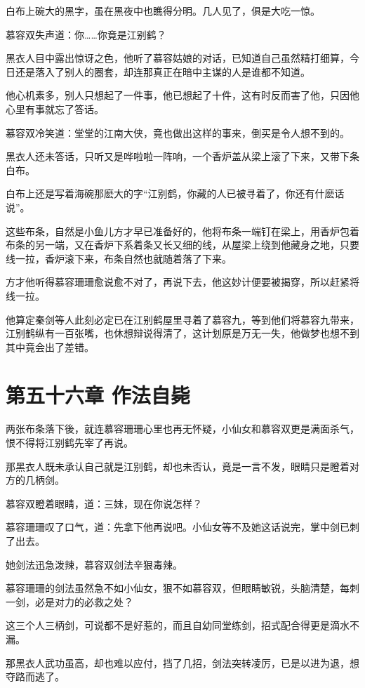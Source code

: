 \documentclass[12pt,oneside]{book}
\begin{document}
白布上碗大的黑字，虽在黑夜中也瞧得分明。几人见了，俱是大吃一惊。

慕容双失声道：你\ldots\ldots 你竟是江别鹤？

黑衣人目中露出惊讶之色，他听了慕容姑娘的对话，已知道自己虽然精打细算，今日还是落入了别人的圈套，却连那真正在暗中主谋的人是谁都不知道。

他心机素多，别人只想起了一件事，他已想起了十件，这有时反而害了他，只因他心里有事就忘了答话。

慕容双冷笑道：堂堂的江南大侠，竟也做出这样的事来，倒买是令人想不到的。

黑衣人还未答话，只听又是哗啦啦一阵响，一个香炉盖从梁上滚了下来，又带下条白布。

白布上还是写着海碗那麽大的字``江别鹤，你藏的人已被寻着了，你还有什麽话说''。

这些布条，自然是小鱼儿方才早已准备好的，他将布条一端钉在梁上，用香炉包着布条的另一端，又在香炉下系着条又长又细的线，从屋梁上绕到他藏身之地，只要线一拉，香炉滚下来，布条自然也就随着落了下来。

方才他听得慕容珊珊愈说愈不对了，再说下去，他这妙计便要被揭穿，所以赶紧将线一拉。

他算定秦剑等人此刻必定已在江别鹤屋里寻着了慕容九，等到他们将慕容九带来，江别鹤纵有一百张嘴，也休想辩说得清了，这计划原是万无一失，他做梦也想不到其中竟会出了差错。

\hypertarget{ux7b2cux4e94ux5341ux516dux7ae0-ux4f5cux6cd5ux81eaux6bd9}{%
\chapter{第五十六章
作法自毙}\label{ux7b2cux4e94ux5341ux516dux7ae0-ux4f5cux6cd5ux81eaux6bd9}}

两张布条落下後，就连慕容珊珊心里也再无怀疑，小仙女和慕容双更是满面杀气，恨不得将江别鹤先宰了再说。

那黑衣人既未承认自己就是江别鹤，却也未否认，竟是一言不发，眼睛只是瞪着对方的几柄剑。

慕容双瞪着眼睛，道：三妹，现在你说怎样？

慕容珊珊叹了口气，道：先拿下他再说吧。小仙女等不及她这话说完，掌中剑已刺了出去。

她剑法迅急泼辣，慕容双剑法辛狠毒辣。

慕容珊珊的剑法虽然急不如小仙女，狠不如慕容双，但眼睛敏锐，头脑清楚，每刺一剑，必是对力的必救之处？

这三个人三柄剑，可说都不是好惹的，而且自幼同堂练剑，招式配合得更是滴水不漏。

那黑衣人武功虽高，却也难以应付，挡了几招，剑法突转凌厉，已是以进为退，想夺路而逃了。
\end{document}
